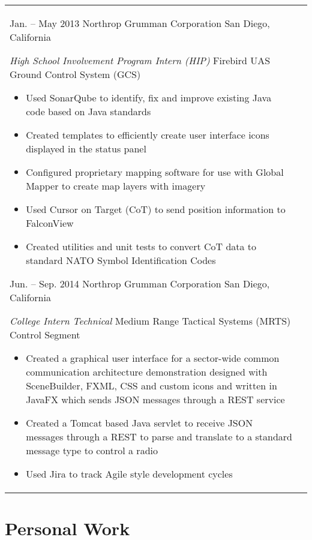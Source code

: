 \documentclass[print]{friggeri-cv} %
\makeatletter
\renewenvironment{entrylist}{%
	\par\begin{tabular*}{\textwidth}{@{\extracolsep{\fill}}ll}
	}{%
\end{tabular*}\par
}
\makeatother
\begin{document}
\begin{entrylist}
\entry
{Jan. -- May 2013}
{Northrop Grumman Corporation}
{San Diego, California}
{\emph{High School Involvement Program Intern (HIP)}
Firebird UAS Ground Control System (GCS)
\begin{itemize}
\item Used SonarQube to identify, fix and improve existing Java code based on Java standards
\item Created templates to efficiently create user interface icons displayed in the status panel
\item Configured proprietary mapping software for use with Global Mapper to create map layers with imagery
\item Used Cursor on Target (CoT) to send position information to FalconView
\item Created utilities and unit tests to convert CoT data to standard NATO Symbol Identification Codes
\end{itemize}}
\entry
{Jun. -- Sep. 2014}
{Northrop Grumman Corporation}
{San Diego, California}
{\emph{College Intern Technical}
Medium Range Tactical Systems (MRTS)  Control Segment
\begin{itemize}
\item Created a graphical user interface for a sector-wide common communication architecture demonstration designed with SceneBuilder, FXML, CSS and custom icons and written in JavaFX which sends JSON messages through a REST service
\item Created a Tomcat based Java servlet to receive JSON messages through a REST to parse and translate to a standard message type to control a radio
\item Used Jira to track Agile style development cycles
\end{itemize}}
\end{entrylist}


\section{Personal Work}
\end{document}
